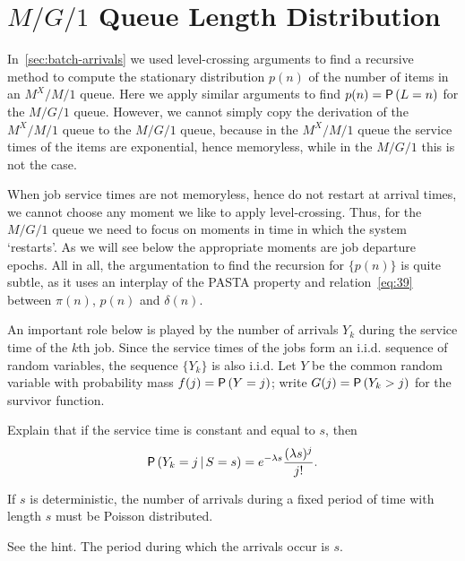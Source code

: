 \section{$M/G/1$ Queue Length Distribution}
\label{sec:distr-queue-length}




In~\cref{sec:batch-arrivals} we used level-crossing arguments to find a recursive method to compute the stationary distribution $p(n)$ of the number of items in an $M^X/M/1$ queue.
Here we apply similar arguments to find $p(n)=\P{L=n}$ for the $M/G/1$ queue.
However, we cannot simply copy the derivation of the $M^X/M/1$ queue to the $M/G/1$ queue, because in the $M^X/M/1$ queue the service times of the items are exponential, hence memoryless, while in the $M/G/1$ this is not the case.


When job service times are not memoryless, hence do not restart at arrival times, we cannot choose any moment we like to apply level-crossing.
Thus, for the $M/G/1$ queue we need to focus on moments in time in which the system `restarts'.
As we will see below the appropriate moments are job departure epochs.
All in all, the argumentation to find the recursion for $\{p(n)\}$ is quite subtle, as it uses an interplay of the PASTA property and relation~\cref{eq:39} between $\pi(n)$, $p(n)$ and $\delta(n)$.

An important role below is played by  the number of  arrivals $Y_k$ during the service time of the $k$th job.  Since the service times of the jobs form an i.i.d. sequence of random variables, the sequence $\{Y_k\}$ is also i.i.d. Let $Y$ be the common random variable with probability mass
 $f(j) = \P{Y = j}$; write $G(j) = \P{Y_k > j}$ for the survivor function.


\begin{extra}\label{ex:75}
 Explain that if the service time is constant and equal to $s$, then
\begin{equation}\label{eq:4}
  \P{Y_k = j\given S=s} = e^{-\lambda s}\frac{(\lambda s)^j}{j!}.
\end{equation}
\begin{hint}
If $s$ is deterministic, the number of arrivals during a fixed
    period of time with length $s$ must be Poisson distributed.
\end{hint}
\begin{solution}
See the hint.  The period during which the arrivals occur is $s$. 
\end{solution}
\end{extra}

